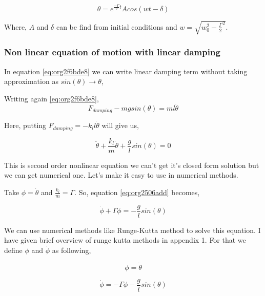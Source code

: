 \documentclass{article}
\begin{document}
\begin{equation}
\label{eq:orgfa1e4db}
\theta = e^{\frac{-\Gamma}{2}t}A cos(wt-\delta)
\end{equation}

Where, \(A\) and \(\delta\) can be find from initial conditions and \(w = \sqrt{w_{0}^{2}-\frac{\Gamma}{2}^{2}}\).

\subsubsection{Non linear equation of motion with linear damping}
\label{sec:org182b73a}

In equation \ref{eq:org2f6bde8} we can write linear damping term without taking approximation as \(sin(\theta) \to \theta\),

Writing again \ref{eq:org2f6bde8}, 
\begin{equation*}
\label{eq:org63731a3}
F_{damping}-mgsin(\theta)=ml\ddot{\theta}
\end{equation*}

Here, putting \(F_{damping}=-k_{l}l\dot{\theta}\) will give us,

\begin{equation}
\label{eq:org2506add}
\ddot{\theta}+\frac{k_{l}}{m}\dot{\theta}+\frac{g}{l}sin(\theta)=0
\end{equation}

This is second order nonlinear equation we can't get it's closed form solution but we can get numerical one. Let's make it easy to use in numerical methods.

Take \(\phi = \dot{\theta}\) and \(\frac{k_{l}}{m}=\Gamma\). So, equation \ref{eq:org2506add} becomes,

\begin{equation}
\label{eq:org5c4e7c5}
\dot{\phi}+\Gamma\phi=-\frac{g}{l} sin(\theta)
\end{equation}

We can use numerical methods like Runge-Kutta method to solve this equation. I have given brief overview of runge kutta methods in appendix 1. For that we define \(\phi\) and \(\dot{\phi}\) as following,

\begin{equation}
\label{eq:org05a9f91}
\phi=\dot{\theta}
\end{equation}

\begin{equation}
\label{eq:orge830ec7}
\dot{\phi}=-\Gamma\phi-\frac{g}{l} sin(\theta)
\end{equation}
\end{document}
